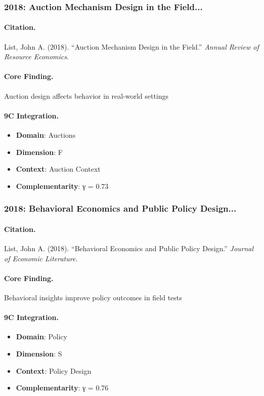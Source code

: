 \subsubsection{2018: Auction Mechanism Design in the Field...}

\paragraph{Citation.}
List, John A. (2018). ``Auction Mechanism Design in the Field.''
\textit{Annual Review of Resource Economics}.

\paragraph{Core Finding.}
Auction design affects behavior in real-world settings

\paragraph{9C Integration.}
\begin{itemize}[nosep]
  \item \textbf{Domain}: Auctions
  \item \textbf{Dimension}: F
  \item \textbf{Context}: Auction Context
  \item \textbf{Complementarity}: γ = 0.73
\end{itemize}


\subsubsection{2018: Behavioral Economics and Public Policy Design...}

\paragraph{Citation.}
List, John A. (2018). ``Behavioral Economics and Public Policy Design.''
\textit{Journal of Economic Literature}.

\paragraph{Core Finding.}
Behavioral insights improve policy outcomes in field tests

\paragraph{9C Integration.}
\begin{itemize}[nosep]
  \item \textbf{Domain}: Policy
  \item \textbf{Dimension}: S
  \item \textbf{Context}: Policy Design
  \item \textbf{Complementarity}: γ = 0.76
\end{itemize}


